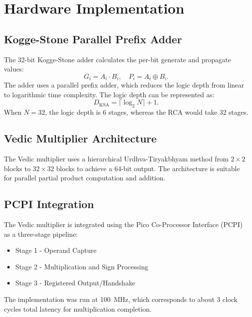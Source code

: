\section{Hardware Implementation}
\label{sec:implementation}

\subsection{Kogge-Stone Parallel Prefix Adder}
The 32-bit Kogge-Stone adder calculates the per-bit generate and propagate values:
\begin{equation}
G_i = A_i \cdot B_i,\quad P_i = A_i \oplus B_i.
\label{eq:gp}
\end{equation}
The adder uses a parallel prefix adder, which reduces the logic depth from linear to logarithmic time complexity. The logic depth can be represented as:
\begin{equation}
D_{\mathrm{KSA}} = \lceil \log_2 N \rceil + 1.
\label{eq:ksa_depth}
\end{equation}
When $N = 32$, the logic depth is 6 stages, whereas the RCA would take 32 stages.

\subsection{Vedic Multiplier Architecture}
The Vedic multiplier uses a hierarchical Urdhva-Tiryakbhyam method from $2 \times 2$ blocks to $32 \times 32$ blocks to achieve a 64-bit output. The architecture is suitable for parallel partial product computation and addition.

\subsection{PCPI Integration}
The Vedic multiplier is integrated using the Pico Co-Processor Interface (PCPI) as a three-stage pipeline:
\begin{itemize}
\item Stage 1 - Operand Capture
\item Stage 2 - Multiplication and Sign Processing
\item Stage 3 - Registered Output/Handshake
\end{itemize}
The implementation was run at 100~MHz, which corresponds to about 3 clock cycles total latency for multiplication completion.
